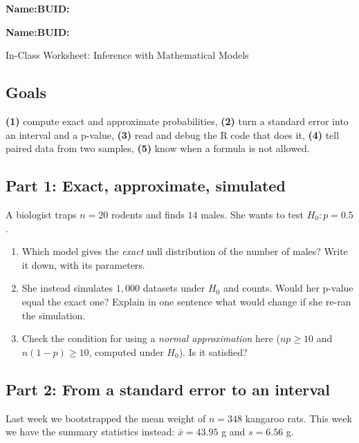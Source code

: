 \documentclass{article}
\newcommand{\blankline}[1]{\underline{\hspace{#1}}}
\begin{document}
\noindent\textbf{Name:}\blankline{2.25in}\hfill\textbf{BUID:}\blankline{1.55in}

\medskip

\noindent\textbf{Name:}\blankline{2.25in}\hfill\textbf{BUID:}\blankline{1.55in}\newline

\begin{center}
 \Large In-Class Worksheet: Inference with Mathematical Models
\end{center}

\subsection*{Goals}
\noindent\textbf{(1)} compute exact and approximate probabilities, \textbf{(2)} turn a standard error into an interval and a p-value, \textbf{(3)} read and debug the R code that does it, \textbf{(4)} tell paired data from two samples, \textbf{(5)} know when a formula is not allowed.

\subsection*{Part 1: Exact, approximate, simulated}
A biologist traps $n=20$ rodents and finds $14$ males. She wants to test $H_0: p = 0.5$.

\begin{enumerate}[label={\bfseries (\Alph*)},itemsep=.8em]
\item Which model gives the \emph{exact} null distribution of the number of males? Write it down, with its parameters. \\[2.5em]
\item She instead simulates $1{,}000$ datasets under $H_0$ and counts. Would her p-value equal the exact one? Explain in one sentence what would change if she re-ran the simulation. \\[3.5em]
\item Check the condition for using a \emph{normal approximation} here ($np \ge 10$ and $n(1-p) \ge 10$, computed under $H_0$). Is it satisfied? \\[2.5em]
\end{enumerate}

\subsection*{Part 2: From a standard error to an interval}
Last week we bootstrapped the mean weight of $n = 348$ kangaroo rats. This week we have the summary statistics instead: $\bar{x} = 43.95$ g and $s = 6.56$ g.
\end{document}
